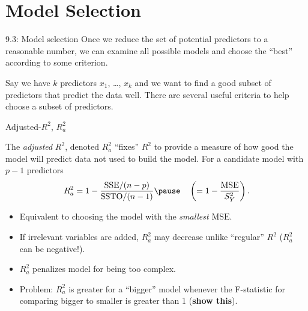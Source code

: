 \documentclass{beamer}
\begin{document}
\section{Model Selection}

\begin{frame}{9.3: Model selection}
Once we reduce the set of potential predictors to a reasonable
number, we can examine all possible models and choose the ``best''
according to some criterion.
\vspace{10pt}

\pause Say we have $k$ predictors $x_1$, \ldots, $x_k$ and we want to find a good subset of predictors that predict the data well. There are several
useful criteria to help choose a subset of predictors.
\end{frame}

\begin{frame}{Adjusted-$R^2$, $R_a^2$}
\begin{small}

The \textit{adjusted} $R^2$, denoted $R_a^2$ ``fixes'' $R^2$ to provide a measure of how good the  model will predict data not used to build the model. For a candidate model with $p-1$ predictors
$$
R^2_a=1-\frac{\text{SSE}/(n-p)}{\text{SSTO}/(n-1)}\pause\quad\left(=1-\frac{\text{MSE}}{S^2_Y}\right).
$$
\begin{itemize}
\item<2-> Equivalent to choosing the model with the \textit{smallest} $\text{MSE}$.
\item<3-> If irrelevant variables are added, $R_a^2$ may decrease unlike ``regular'' $R^2$ ($R^2_a$ can be negative!).
\item<4-> $R_a^2$ penalizes model for being too complex.
\item<5-> Problem: $R_a^2$ is greater for a ``bigger'' model whenever the
F-statistic for comparing bigger to smaller is greater than 1 (\textbf{show this}). 
\end{itemize}
\end{small}
\end{frame}
\end{document}
